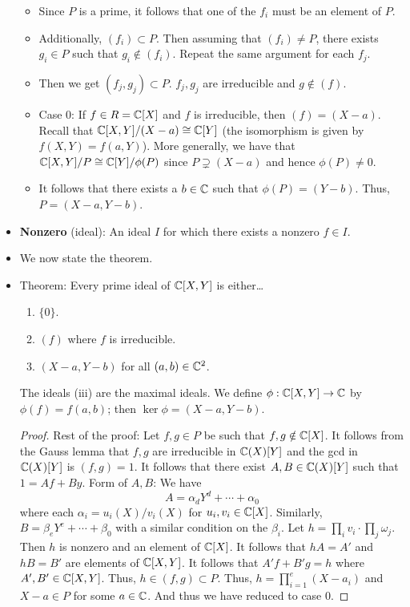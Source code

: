 \documentclass[../notes.tex]{subfiles}
\begin{document}
\begin{itemize}
\begin{itemize}
        \item Since $P$ is a prime, it follows that one of the $f_i$ must be an element of $P$.
        \item Additionally, $(f_i)\subset P$. Then assuming that $(f_i)\neq P$, there exists $g_i\in P$ such that $g_i\notin(f_i)$. Repeat the same argument for each $f_j$.
        \item Then we get $(f_j,g_j)\subset P$. $f_j,g_j$ are irreducible and $g\notin(f)$.
        \item Case 0: If $f\in R=\mathbb{C}[X]$ and $f$ is irreducible, then $(f)=(X-a)$. Recall that $\mathbb{C}[X,Y]/(X-a)\cong\mathbb{C}[Y]$ (the isomorphism is given by $f(X,Y)=f(a,Y)$). More generally, we have that $\mathbb{C}[X,Y]/P\cong\mathbb{C}[Y]/\phi(P)$ since $P\supsetneq(X-a)$ and hence $\phi(P)\neq 0$.
        \item It follows that there exists a $b\in\mathbb{C}$ such that $\phi(P)=(Y-b)$. Thus, $P=(X-a,Y-b)$.
    \end{itemize}
    \item \textbf{Nonzero} (ideal): An ideal $I$ for which there exists a nonzero $f\in I$.
    \item We now state the theorem.
    \item Theorem: Every prime ideal of $\mathbb{C}[X,Y]$ is either\dots
    \begin{enumerate}[label={(\roman*)}]
        \item $\{0\}$.
        \item $(f)$ where $f$ is irreducible.
        \item $(X-a,Y-b)$ for all $(a,b)\in\mathbb{C}^2$.
    \end{enumerate}
    The ideals (iii) are the maximal ideals. We define $\phi:\mathbb{C}[X,Y]\to\mathbb{C}$ by $\phi(f)=f(a,b)$; then $\ker\phi=(X-a,Y-b)$.
    \begin{proof}
        Rest of the proof: Let $f,g\in P$ be such that $f,g\notin\mathbb{C}[X]$. It follows from the Gauss lemma that $f,g$ are irreducible in $\mathbb{C}(X)[Y]$ and the gcd in $\mathbb{C}(X)[Y]$ is $(f,g)=1$. It follows that there exist $A,B\in\mathbb{C}(X)[Y]$ such that $1=Af+By$.
        Form of $A,B$: We have
        \begin{equation*}
            A = \alpha_dY^d+\cdots+\alpha_0
        \end{equation*}
        where each $\alpha_i=u_i(X)/v_i(X)$ for $u_i,v_i\in\mathbb{C}[X]$. Similarly, $B=\beta_eY^e+\cdots+\beta_0$ with a similar condition on the $\beta_i$.
        Let $h=\prod_iv_i\cdot\prod_j\omega_j$. Then $h$ is nonzero and an element of $\mathbb{C}[X]$. It follows that $hA=A'$ and $hB=B'$ are elements of $\mathbb{C}[X,Y]$. It follows that $A'f+B'g=h$ where $A',B'\in\mathbb{C}[X,Y]$. Thus, $h\in(f,g)\subset P$. Thus, $h=\prod_{i=1}^e(X-a_i)$ and $X-a\in P$ for some $a\in\mathbb{C}$. And thus we have reduced to case 0.

\end{proof}
\end{itemize}
\end{document}
